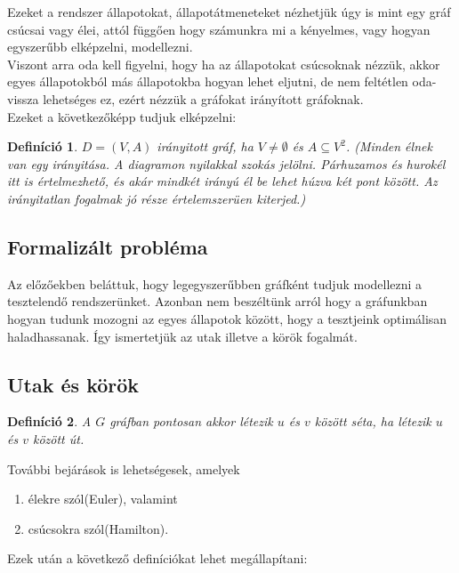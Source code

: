 \documentclass[12pt]{article}
\newtheorem{defin}{Definíció}[section]
\begin{document}
Ezeket a rendszer állapotokat, állapotátmeneteket nézhetjük úgy is mint egy gráf csúcsai vagy élei, attól függően hogy számunkra mi a kényelmes, vagy hogyan egyszerűbb elképzelni, modellezni.\\
Viszont arra oda kell figyelni, hogy ha az állapotokat csúcsoknak nézzük, akkor egyes állapotokból más állapotokba hogyan lehet eljutni, de nem feltétlen oda-vissza lehetséges ez, ezért nézzük a gráfokat irányított gráfoknak.\\
Ezeket a következőképp tudjuk elképzelni:

\begin{defin}
$D = (V,A)$ irányitott gráf, ha $V \neq \emptyset$ és $A \subseteq V^2$. (Minden élnek van egy irányitása. A diagramon nyilakkal szokás jelölni. Párhuzamos és hurokél itt is értelmezhető, és akár mindkét irányú él be lehet húzva két pont között. Az irányitatlan fogalmak jó része értelemszerüen kiterjed.) ~\cite{szam:Fleiner}
\end{defin}

\subsection{Formalizált probléma}

Az előzőekben beláttuk, hogy legegyszerűbben gráfként tudjuk modellezni a tesztelendő rendszerünket. Azonban nem beszéltünk arról hogy a gráfunkban hogyan tudunk mozogni az egyes állapotok között, hogy a tesztjeink optimálisan haladhassanak. Így ismertetjük az utak illetve a körök fogalmát.\\

\subsection{Utak és körök}

\begin{defin}
A $G$ gráfban pontosan akkor létezik $u$ és $v$ között séta, ha létezik $u$ és $v$ között út. ~\cite{szam:Fleiner}
\end{defin}

További bejárások is lehetségesek, amelyek
\begin{enumerate}
\item élekre szól(Euler), valamint 
\item csúcsokra szól(Hamilton).
\end{enumerate}

Ezek után a következő definíciókat lehet megállapítani:
\end{document}
